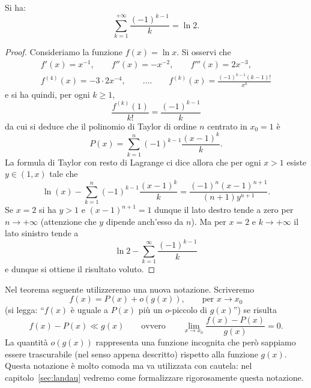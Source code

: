\begin{example}
Si ha:
  \[
    \sum_{k=1}^{+\infty} \frac{(-1)^{k-1}}{k} = \ln 2.
  \]
\end{example}
\begin{proof}
Consideriamo la funzione $f(x) = \ln x$.
Si osservi che
\begin{gather*}
  f'(x) = x^{-1},\qquad
  f''(x) = -x^{-2},\qquad
  f'''(x) = 2x^{-3}, \\
  f^{(4)}(x) = -3\cdot 2 x^{-4}, \qquad
  \dots. \qquad
  f^{(k)}(x) = \frac{(-1)^{k-1}(k-1)!}{x^k}
\end{gather*}
e si ha quindi, per ogni $k\ge 1$,
\[
  \frac{f^{(k)}(1)}{k!} = \frac{(-1)^{k-1}}{k}
\]
da cui si deduce che il polinomio di Taylor di ordine $n$
centrato in $x_0=1$ è
\[
P(x) = \sum_{k=1}^n (-1)^{k-1}\frac{(x-1)^k}{k}.
\]
La formula di Taylor con resto di Lagrange ci dice allora che per
ogni $x>1$ esiste $y\in(1,x)$ tale che
\[
  \ln(x) - \sum_{k=1}^n (-1)^{k-1}\frac{(x-1)^k}{k} 
  = \frac{(-1)^n(x-1)^{n+1}}{(n+1)y^{n+1}}.
\]
Se $x=2$ si ha $y>1$ e $(x-1)^{n+1}=1$ dunque
il lato destro tende a zero per $n\to +\infty$ 
(attenzione che $y$ dipende anch'esso da $n$). 
Ma per $x=2$ e $k\to +\infty$ il lato sinistro tende a 
\[
 \ln 2 - \sum_{k=1}^\infty \frac{(-1)^{k-1}}{k}
\]
e dunque si ottiene il risultato voluto.
\end{proof}

Nel teorema seguente utilizzeremo una nuova notazione. Scriveremo
\[
  f(x) = P(x) + o(g(x)), \qquad \text{per $x\to x_0$}
\]
(si legga: ``$f(x)$ è uguale a $P(x)$ più un $o$-piccolo di $g(x)$'')
se risulta
\[
  f(x) - P(x) \ll g(x)
  \qquad\text{ovvero}\qquad
  \lim_{x\to x_0} \frac{f(x)-P(x)}{g(x)} = 0.
\]
La quantità $o(g(x))$ rappresenta una funzione incognita
che però sappiamo essere trascurabile (nel senso appena descritto)
rispetto alla funzione $g(x)$.
Questa notazione è molto comoda ma va utilizzata con cautela:
nel capitolo~\ref{sec:landau} vedremo come formalizzare rigorosamente 
questa notazione.

